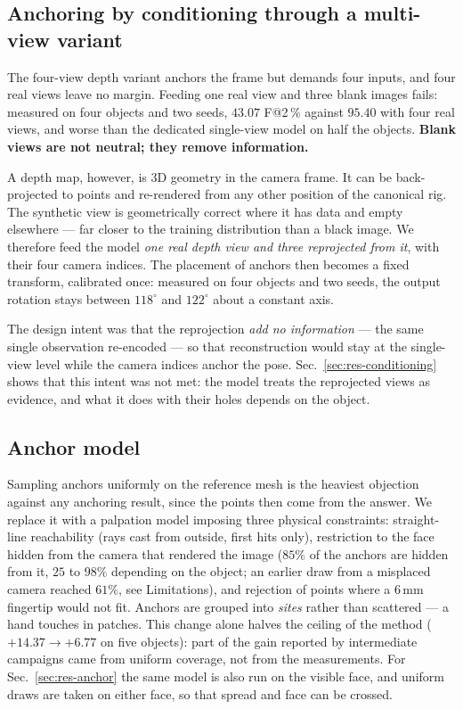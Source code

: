 \documentclass[conference]{IEEEtran}
\makeatletter
\newcommand{\Fs}{F@2\,\%}
\makeatother
\begin{document}
\subsection{Anchoring by conditioning through a multi-view variant}
\label{sec:conditioning}

The four-view depth variant anchors the frame but demands four inputs, and four real
views leave no margin. Feeding one real view and three blank images fails: measured on
four objects and two seeds, $43.07$ \Fs{} against $95.40$ with four real views, and
worse than the dedicated single-view model on half the objects. \textbf{Blank views
are not neutral; they remove information.}

A depth map, however, is 3D geometry in the camera frame. It can be back-projected to
points and re-rendered from any other position of the canonical rig. The synthetic
view is geometrically correct where it has data and empty elsewhere --- far closer to
the training distribution than a black image. We therefore feed the model \emph{one
real depth view and three reprojected from it}, with their four camera indices. The
placement of anchors then becomes a fixed transform, calibrated once: measured on four
objects and two seeds, the output rotation stays between $118^\circ$ and $122^\circ$
about a constant axis.

The design intent was that the reprojection \emph{add no information} --- the same
single observation re-encoded --- so that reconstruction would stay at the single-view
level while the camera indices anchor the pose. Sec.~\ref{sec:res-conditioning} shows
that this intent was not met: the model treats the reprojected views as evidence, and
what it does with their holes depends on the object.

\subsection{Anchor model}
\label{sec:contactmodel}

Sampling anchors uniformly on the reference mesh is the heaviest objection against any
anchoring result, since the points then come from the answer. We replace it with a
palpation model imposing three physical constraints: straight-line reachability (rays
cast from outside, first hits only), restriction to the face hidden from the camera that
rendered the image ($85\%$ of the anchors are hidden from it, $25$ to $98\%$ depending
on the object; an earlier draw from a misplaced camera reached $61\%$, see
Limitations), and
rejection of points where a 6\,mm fingertip would not fit. Anchors are grouped into
\emph{sites} rather than scattered --- a hand touches in patches. This change alone
halves the ceiling of the method ($+14.37 \rightarrow +6.77$ on five objects): part
of the gain reported by intermediate campaigns came from uniform coverage, not from
the measurements. For Sec.~\ref{sec:res-anchor} the same model is also run on the
visible face, and uniform draws are taken on either face, so that spread and face can
be crossed.
\end{document}
